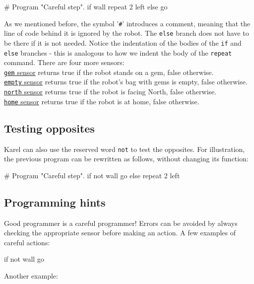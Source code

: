 \begin{bluecode}
# Program "Careful step".
if wall
    repeat 2
        left
else
    go
\end{bluecode}
As we mentioned before, the symbol '{\tt \#}' introduces a comment, meaning that the line 
of code behind it is ignored by the robot.
The {\tt else} branch does not have to be there if it is not needed. Notice the indentation 
of the bodies of the {\tt if} and {\tt else} branches - this is analogous 
to how we indent the body of the {\tt repeat} command. There are four more sensors:\\

\noindent
\underline{{\tt gem} sensor} returns true if the robot stands on a gem, false otherwise. \\

\noindent
\underline{{\tt empty} sensor} returns true if the robot's bag with gems is empty, false otherwise. \\

\noindent
\underline{{\tt north} sensor} returns true if the robot is facing North, false otherwise.\\

\noindent
\underline{{\tt home} sensor} returns true if the robot is at home, false otherwise.

\subsection*{Testing opposites}

Karel can also use the reserved word {\tt not} to test the opposites.
For illustration, the previous program can be rewritten as follows, without 
changing its function:
\begin{bluecode}
# Program "Careful step".
if not wall
    go
else
    repeat 2
        left
\end{bluecode}

\subsection{Programming hints}

Good programmer is a careful programmer! Errors can be avoided by always checking the 
appropriate sensor before making an action. A few examples of careful actions:
 
\begin{bluecode}
if not wall
    go
\end{bluecode}
Another example:
 
